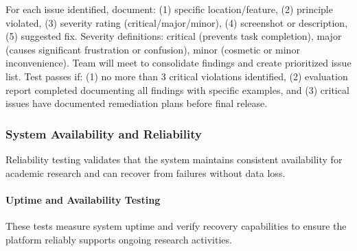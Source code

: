 \documentclass[12pt, titlepage]{article}
\begin{document}
\begin{enumerate}
For each issue identified, document: (1) specific location/feature, (2) principle violated, (3) severity rating (critical/major/minor), (4) screenshot or description, (5) suggested fix. Severity definitions: critical (prevents task completion), major (causes significant frustration or confusion), minor (cosmetic or minor inconvenience). Team will meet to consolidate findings and create prioritized issue list. Test passes if: (1) no more than 3 critical violations identified, (2) evaluation report completed documenting all findings with specific examples, and (3) critical issues have documented remediation plans before final release.

\end{enumerate}

\subsubsection{System Availability and Reliability}

Reliability testing validates that the system maintains consistent availability for academic research and can recover from failures without data loss.

\paragraph{Uptime and Availability Testing}

These tests measure system uptime and verify recovery capabilities to ensure the platform reliably supports ongoing research activities.
\end{document}
